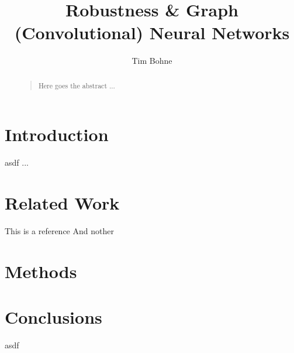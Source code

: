 \documentclass[a4paper,preprint]{sig-alternate}
\begin{document}
\title{Robustness \& Graph (Convolutional) Neural Networks}


%
\author{
%
\alignauthor Tim Bohne\\
}

\maketitle


\begin{abstract}
\begin{quote}
Here goes the abstract ... 
\end{quote}
\end{abstract}

\section{Introduction}
asdf ...


\section{Related Work}

This is a reference \cite{Z_gner_2019}\newline
And nother \cite{10.1145/3394486.3403217}

\section{Methods}


\section{Conclusions}
asdf



\end{document}
